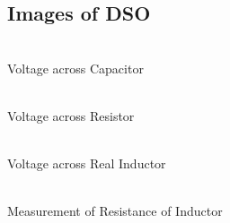 \documentclass{article}
\begin{document}
\subsection{Images of DSO}
\vspace{5px}
\begin{multicols}{2}
\begin{center}
 \\ \vspace{5px}
Voltage across Capacitor\\

\columnbreak

 \\ \vspace{5px}
Voltage across Resistor
\end{center}
\end{multicols}
\begin{multicols}{2}
\begin{center}
 \\ \vspace{5px}
Voltage across Real Inductor \\

\columnbreak

 \\ \vspace{5px}
Measurement of Resistance of Inductor
\end{center}
\end{multicols}
\newpage
\end{document}
